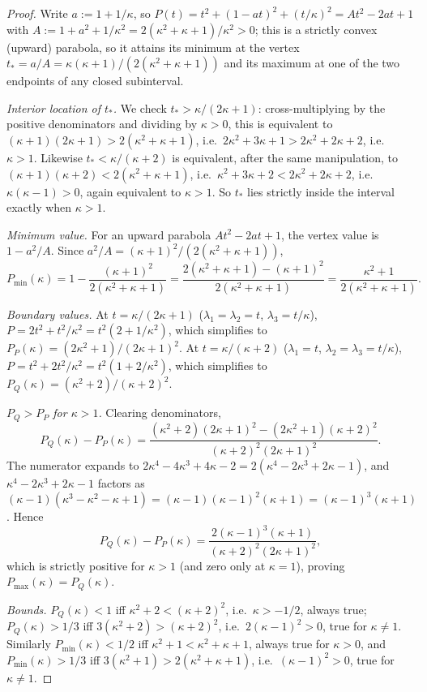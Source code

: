 \documentclass{article}
\theoremstyle{remark}
\begin{document}
\begin{proof}
Write $a:=1+1/\kappa$, so $P(t)=t^2+(1-at)^2+(t/\kappa)^2=At^2-2at+1$ with $A:=1+a^2+1/\kappa^2=2(\kappa^2+\kappa+1)/\kappa^2>0$; this is a strictly convex (upward) parabola, so it attains its minimum at the vertex $t_*=a/A=\kappa(\kappa+1)/(2(\kappa^2+\kappa+1))$ and its maximum at one of the two endpoints of any closed subinterval.

\emph{Interior location of $t_*$.} We check $t_*>\kappa/(2\kappa+1)$: cross-multiplying by the positive denominators and dividing by $\kappa>0$, this is equivalent to $(\kappa+1)(2\kappa+1)>2(\kappa^2+\kappa+1)$, i.e.\ $2\kappa^2+3\kappa+1>2\kappa^2+2\kappa+2$, i.e.\ $\kappa>1$. Likewise $t_*<\kappa/(\kappa+2)$ is equivalent, after the same manipulation, to $(\kappa+1)(\kappa+2)<2(\kappa^2+\kappa+1)$, i.e.\ $\kappa^2+3\kappa+2<2\kappa^2+2\kappa+2$, i.e.\ $\kappa(\kappa-1)>0$, again equivalent to $\kappa>1$. So $t_*$ lies strictly inside the interval exactly when $\kappa>1$.

\emph{Minimum value.} For an upward parabola $At^2-2at+1$, the vertex value is $1-a^2/A$. Since $a^2/A=(\kappa+1)^2/(2(\kappa^2+\kappa+1))$,
\[
P_{\min}(\kappa) = 1-\frac{(\kappa+1)^2}{2(\kappa^2+\kappa+1)} = \frac{2(\kappa^2+\kappa+1)-(\kappa+1)^2}{2(\kappa^2+\kappa+1)} = \frac{\kappa^2+1}{2(\kappa^2+\kappa+1)}.
\]

\emph{Boundary values.} At $t=\kappa/(2\kappa+1)$ ($\lambda_1=\lambda_2=t$, $\lambda_3=t/\kappa$), $P=2t^2+t^2/\kappa^2=t^2(2+1/\kappa^2)$, which simplifies to $P_P(\kappa)=(2\kappa^2+1)/(2\kappa+1)^2$. At $t=\kappa/(\kappa+2)$ ($\lambda_1=t$, $\lambda_2=\lambda_3=t/\kappa$), $P=t^2+2t^2/\kappa^2=t^2(1+2/\kappa^2)$, which simplifies to $P_Q(\kappa)=(\kappa^2+2)/(\kappa+2)^2$.

\emph{$P_Q>P_P$ for $\kappa>1$.} Clearing denominators,
\[
P_Q(\kappa)-P_P(\kappa) = \frac{(\kappa^2+2)(2\kappa+1)^2-(2\kappa^2+1)(\kappa+2)^2}{(\kappa+2)^2(2\kappa+1)^2}.
\]
The numerator expands to $2\kappa^4-4\kappa^3+4\kappa-2=2(\kappa^4-2\kappa^3+2\kappa-1)$, and $\kappa^4-2\kappa^3+2\kappa-1$ factors as $(\kappa-1)(\kappa^3-\kappa^2-\kappa+1)=(\kappa-1)(\kappa-1)^2(\kappa+1)=(\kappa-1)^3(\kappa+1)$. Hence
\[
P_Q(\kappa)-P_P(\kappa) = \frac{2(\kappa-1)^3(\kappa+1)}{(\kappa+2)^2(2\kappa+1)^2},
\]
which is strictly positive for $\kappa>1$ (and zero only at $\kappa=1$), proving $P_{\max}(\kappa)=P_Q(\kappa)$.

\emph{Bounds.} $P_Q(\kappa)<1$ iff $\kappa^2+2<(\kappa+2)^2$, i.e.\ $\kappa>-1/2$, always true; $P_Q(\kappa)>1/3$ iff $3(\kappa^2+2)>(\kappa+2)^2$, i.e.\ $2(\kappa-1)^2>0$, true for $\kappa\neq1$. Similarly $P_{\min}(\kappa)<1/2$ iff $\kappa^2+1<\kappa^2+\kappa+1$, always true for $\kappa>0$, and $P_{\min}(\kappa)>1/3$ iff $3(\kappa^2+1)>2(\kappa^2+\kappa+1)$, i.e.\ $(\kappa-1)^2>0$, true for $\kappa\neq1$.
\end{proof}
\end{document}
